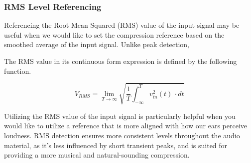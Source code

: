 \documentclass[10pt]{article}
\begin{document}
\begin{multicols*}{2}
                \subsubsection{RMS Level Referencing}
                    Referencing the Root Mean Squared (RMS) value of the input signal may be useful when we would like to set the compression reference based on the smoothed average of the input signal. Unlike peak detection, 
                    
                    The RMS value in its continuous form expression is defined by the following function. \cite{aes-that-rms}
                    
                        \begin{equation}
                            V_{RMS} = \lim_{T \to \infty}\sqrt{\frac{1}{T}\int_{-\infty}^{T} v_{in}^2(t) \,\cdot dt}
                        \end{equation}
                    
                    Utilizing the RMS value of the input signal is particularly helpful when you would like to utilize a reference that is more aligned with how our ears perceive loudness. RMS detection ensures more consistent levels throughout the audio material, as it's less influenced by short transient peaks, and is suited for providing a more musical and natural-sounding compression.


\end{multicols*}
\end{document}
